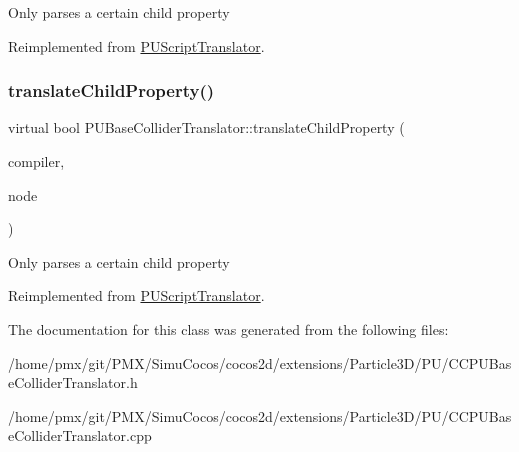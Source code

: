 Only parses a certain child property 

Reimplemented from \hyperlink{classPUScriptTranslator_a0374d83a8a04e57918975d525e0f8fe8}{P\+U\+Script\+Translator}.

\mbox{\label{classPUBaseColliderTranslator_ad0d0dc1bdeaea1af3989bcfecd99eef8}} 
\subsubsection{\texorpdfstring{translate\+Child\+Property()}{translateChildProperty()}\hspace{0.1cm}{\footnotesize\ttfamily [2/2]}}
{\footnotesize\ttfamily virtual bool P\+U\+Base\+Collider\+Translator\+::translate\+Child\+Property (\begin{DoxyParamCaption}\item[{\hyperlink{classPUScriptCompiler}{P\+U\+Script\+Compiler} $\ast$}]{compiler,  }\item[{\hyperlink{classPUAbstractNode}{P\+U\+Abstract\+Node} $\ast$}]{node }\end{DoxyParamCaption})\hspace{0.3cm}{\ttfamily [virtual]}}

Only parses a certain child property 

Reimplemented from \hyperlink{classPUScriptTranslator_a0374d83a8a04e57918975d525e0f8fe8}{P\+U\+Script\+Translator}.



The documentation for this class was generated from the following files\+:\begin{DoxyCompactItemize}
\item 
/home/pmx/git/\+P\+M\+X/\+Simu\+Cocos/cocos2d/extensions/\+Particle3\+D/\+P\+U/C\+C\+P\+U\+Base\+Collider\+Translator.\+h\item 
/home/pmx/git/\+P\+M\+X/\+Simu\+Cocos/cocos2d/extensions/\+Particle3\+D/\+P\+U/C\+C\+P\+U\+Base\+Collider\+Translator.\+cpp\end{DoxyCompactItemize}
